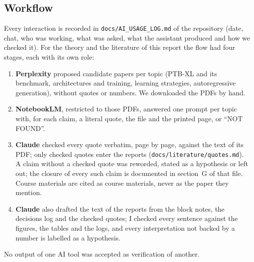\label{app:ai}

\subsection*{Workflow}

Every interaction is recorded in \texttt{docs/AI\_USAGE\_LOG.md} of the repository (date, chat, who
was working, what was asked, what the assistant produced and how we checked it). For the theory and the
literature of this report the flow had four stages, each with its own role:
\begin{enumerate}[leftmargin=1.4em,itemsep=1pt]
  \item \textbf{Perplexity} proposed candidate papers per topic (PTB-XL and its benchmark, architectures
        and training, learning strategies, autoregressive generation), without quotes or numbers. We
        downloaded the PDFs by hand.
  \item \textbf{NotebookLM}, restricted to those PDFs, answered one prompt per topic with, for each
        claim, a literal quote, the file and the printed page, or ``NOT FOUND''.
  \item \textbf{Claude} checked every quote verbatim, page by page, against the text of its PDF; only
        checked quotes enter the reports (\texttt{docs/literature/quotes.md}). A claim without a checked
        quote was reworded, stated as a hypothesis or left out; the closure of every such claim is
        documented in section~G of that file. Course materials are cited as course materials, never as
        the paper they mention.
  \item \textbf{Claude} also drafted the text of the reports from the block notes, the decisions log and
        the checked quotes; I checked every sentence against the figures, the tables and the logs, and
        every interpretation not backed by a number is labelled as a hypothesis.
\end{enumerate}
No output of one AI tool was accepted as verification of another.


